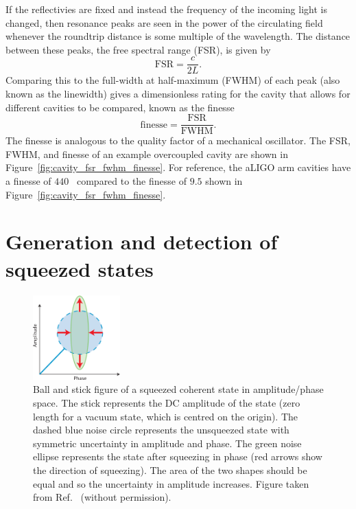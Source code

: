 \documentclass[aps,pra,superscriptaddress,reprint,nofootinbib]{revtex4-1}
\begin{document}
If the reflectivies are fixed and instead the frequency of the incoming light is changed, then resonance peaks are seen in the power of the circulating field whenever the roundtrip distance is some multiple of the wavelength. The distance between these peaks, the free spectral range (FSR), is given by
\begin{equation}
\mathrm{FSR} = \frac{c}{2L}.
\end{equation}
Comparing this to the full-width at half-maximum (FWHM) of each peak (also known as the linewidth) gives a dimensionless rating for the cavity that allows for different cavities to be compared, known as the finesse
\begin{equation}
\mathrm{finesse} = \frac{\mathrm{FSR}}{\mathrm{FWHM}}.
\end{equation}
The finesse is analogous to the quality factor of a mechanical oscillator.
The FSR, FWHM, and finesse of an example overcoupled cavity are shown in Figure~\ref{fig:cavity_fsr_fwhm_finesse}.
For reference, the aLIGO arm cavities have a finesse of $440$~\cite{AdvancedLIGO:2015} compared to the finesse of $9.5$ shown in Figure~\ref{fig:cavity_fsr_fwhm_finesse}.


\section{Generation and detection of squeezed states}
\label{sec:squeezing}

\begin{figure}[ht]%
	\begin{center}
	\includegraphics[width=0.3\textwidth]{figures/ball_and_stick_squeezed_state.png}
	\end{center}
	\caption{Ball and stick figure of a squeezed coherent state in amplitude/phase space. The stick represents the DC amplitude of the state (zero length for a vacuum state, which is centred on the origin). The dashed blue noise circle represents the unsqueezed state with symmetric uncertainty in amplitude and phase. The green noise ellipse represents the state after squeezing in phase (red arrows show the direction of squeezing). The area of the two shapes should be equal and so the uncertainty in amplitude increases. Figure taken from Ref.~\cite{Sparkes2013StorageAM} (without permission).}
	\label{fig:ball_and_stick_squeezed_state}
\end{figure}
\end{document}
